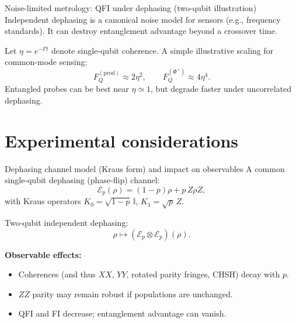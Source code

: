 \documentclass[aspectratio=169]{beamer}
\newcommand{\Id}{\mathbb{I}}
\begin{document}
\begin{frame}{Noise-limited metrology: QFI under dephasing (two-qubit illustration)}
\small
Independent dephasing is a canonical noise model for sensors (e.g., frequency standards).
It can destroy entanglement advantage beyond a crossover time. \citep{Huelga1997PRL,Demkowicz2015ProgOpt,Pezze2018RMP}

\vspace{0.25em}
Let $\eta=e^{-\Gamma t}$ denote single-qubit coherence.
A simple illustrative scaling for common-mode sensing:
\[
F_Q^{(\mathrm{prod})}\approx 2\eta^2,\qquad
F_Q^{(\Phi^+)}\approx 4\eta^4.
\]
Entangled probes can be best near $\eta\simeq 1$, but degrade faster under uncorrelated dephasing. \citep{Huelga1997PRL}

\vspace{0.2em}
\begin{center}
\end{center}
\end{frame}

\section{Experimental considerations}

\begin{frame}{Dephasing channel model (Kraus form) and impact on observables}
\small
A common single-qubit dephasing (phase-flip) channel:
\[
\mathcal{E}_p(\rho)=(1-p)\rho + p\,Z\rho Z,
\]
with Kraus operators $K_0=\sqrt{1-p}\,\Id$, $K_1=\sqrt{p}\,Z$.

\vspace{0.35em}
Two-qubit independent dephasing:
\[
\rho \mapsto (\mathcal{E}_p\otimes \mathcal{E}_p)(\rho).
\]

\vspace{0.35em}
\textbf{Observable effects:}
\begin{itemize}
\item Coherences (and thus $XX$, $YY$, rotated parity fringes, CHSH) decay with $p$.
\item $ZZ$ parity may remain robust if populations are unchanged.
\item QFI and FI decrease; entanglement advantage can vanish. \citep{Huelga1997PRL,Demkowicz2015ProgOpt}
\end{itemize}
\end{frame}
\end{document}
